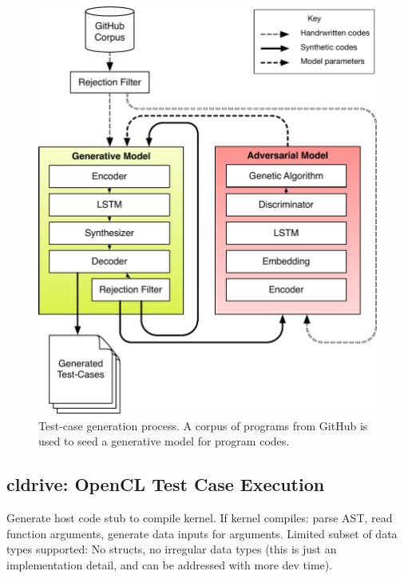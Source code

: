 \begin{figure}
        \centering
        \includegraphics[width=.95\columnwidth]{img/clgen} %
        \caption{%
                Test-case generation process. A corpus of programs from GitHub is used to seed a generative model for program codes.%
        }%
        \label{fig:deeptune}
\end{figure}

\subsection{cldrive: OpenCL Test Case Execution}

Generate host code stub to compile kernel. If kernel compiles: parse AST, read function arguments, generate data inputs for arguments. Limited subset of data types supported: No structs, no irregular data types (this is just an implementation detail, and can be addressed with more dev time).










\printbibliography

